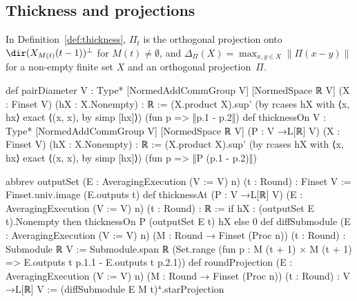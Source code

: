 \subsection{Thickness and projections}\label{app:lean-thickness}

In Definition~\ref{def:thickness}, $\Pi_t$ is the orthogonal projection onto $\dir(X_{M(t)}(t-1))^\perp$ for $M(t)\neq\emptyset$, and $\Delta_\Pi(X)=\max_{x,y\in X}\lVert\Pi(x-y)\rVert$ for a non-empty finite set $X$ and an orthogonal projection~$\Pi$.

\begin{leanlisting}
\begin{leancode}
def pairDiameter
    {V : Type*} [NormedAddCommGroup V] [NormedSpace ℝ V]
    (X : Finset V) (hX : X.Nonempty) : ℝ :=
  (X.product X).sup'
    (by
      rcases hX with ⟨x, hx⟩
      exact ⟨(x, x), by simp [hx]⟩)
    (fun p => ‖p.1 - p.2‖)
def thicknessOn
    {V : Type*} [NormedAddCommGroup V] [NormedSpace ℝ V]
    (P : V →L[ℝ] V)
    (X : Finset V) (hX : X.Nonempty) : ℝ :=
  (X.product X).sup'
    (by
      rcases hX with ⟨x, hx⟩
      exact ⟨(x, x), by simp [hx]⟩)
    (fun p => ‖P (p.1 - p.2)‖)
\end{leancode}
\begin{leancode}
abbrev outputSet (E : AveragingExecution (V := V) n) (t : Round) : Finset V :=
  Finset.univ.image (E.outputs t)
def thicknessAt
    (P : V →L[ℝ] V)
    (E : AveragingExecution (V := V) n)
    (t : Round) : ℝ :=
  if hX : (outputSet E t).Nonempty then
    thicknessOn P (outputSet E t) hX
  else
    0
def diffSubmodule
    (E : AveragingExecution (V := V) n)
    (M : Round → Finset (Proc n))
    (t : Round) : Submodule ℝ V :=
  Submodule.span ℝ
    (Set.range (fun p : M (t + 1) × M (t + 1) => E.outputs t p.1.1 - E.outputs t p.2.1))
def roundProjection
    (E : AveragingExecution (V := V) n)
    (M : Round → Finset (Proc n))
    (t : Round) : V →L[ℝ] V :=
  (diffSubmodule E M t)ᗮ.starProjection
\end{leancode}
\end{leanlisting}

